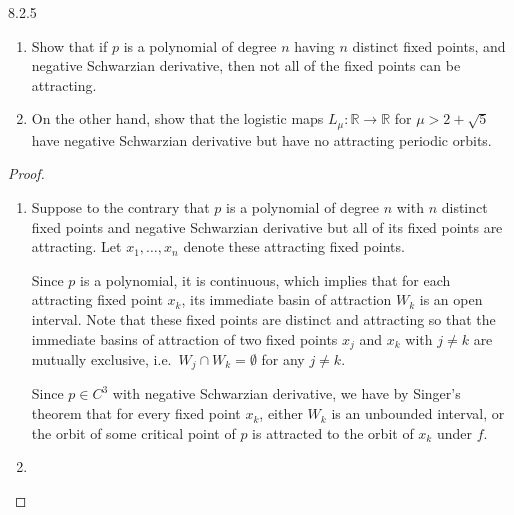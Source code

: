 \begin{problem}{8.2.5}
  \begin{enumerate}
    \item Show that if $p$ is a polynomial of degree $n$ having $n$ distinct
      fixed points, and negative Schwarzian derivative, then not all of the fixed points can
      be attracting.
    \item On the other hand, show that the logistic maps $L_\mu: \mathbb{R} \to \mathbb{R}$
      for $\mu > 2 + \sqrt{5}$ have negative Schwarzian derivative but have no attracting periodic orbits.
  \end{enumerate}
\end{problem}

\begin{proof}
  \begin{enumerate}
    \item Suppose to the contrary that $p$ is a polynomial of degree $n$ with $n$
      distinct fixed points and negative Schwarzian derivative but all of its fixed points
      are attracting. Let $x_1, \dots, x_n$ denote these attracting fixed points.

      Since $p$ is a polynomial, it is continuous, which implies that for each attracting
      fixed point $x_k$, its immediate basin of attraction $W_k$ is an open interval.
      Note that these fixed points are distinct and attracting so that the immediate basins of attraction
      of two fixed points $x_j$ and $x_k$ with $j\neq k$ are mutually exclusive, i.e.\ $W_j \cap W_k = \emptyset$
      for any $j\neq k$.

      Since $p\in C^3$ with negative Schwarzian derivative, we have by Singer's theorem
      that for every fixed point $x_k$, either $W_k$ is an unbounded interval,
      or the orbit of some critical point of $p$ is attracted to the orbit of $x_k$ under $f$.



    \item
  \end{enumerate}
\end{proof}
\newpage
